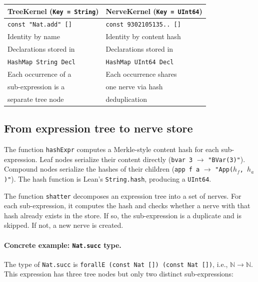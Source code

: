 \begin{center}\small
\begin{tabular}{@{}p{}p{}@{}}
\toprule
\textbf{TreeKernel} (\texttt{Key = String}) & \textbf{NerveKernel} (\texttt{Key = UInt64}) \\
\midrule
\texttt{const "Nat.add" []} & \texttt{const 9302105135.. []} \\[2pt]
Identity by name & Identity by content hash \\[2pt]
Declarations stored in & Declarations stored in \\
\quad\texttt{HashMap String Decl} & \quad\texttt{HashMap UInt64 Decl} \\[2pt]
Each occurrence of a & Each occurrence shares \\
sub-expression is a & one nerve via hash \\
separate tree node & deduplication \\
\bottomrule
\end{tabular}
\end{center}

\subsection{From expression tree to nerve store}\label{sec:tree-to-nerve}

The function \texttt{hashExpr} computes a Merkle-style content hash for each sub-expression.  Leaf nodes serialize their content directly (\texttt{bvar 3} $\to$ \texttt{"BVar(3)"}).  Compound nodes serialize the hashes of their children (\texttt{app f a} $\to$ \texttt{"App($h_f$, $h_a$)"}).  The hash function is Lean's \texttt{String.hash}, producing a \texttt{UInt64}.

The function \texttt{shatter} decomposes an expression tree into a set of nerves.  For each sub-expression, it computes the hash and checks whether a nerve with that hash already exists in the store.  If so, the sub-expression is a duplicate and is skipped.  If not, a new nerve is created.

\paragraph{Concrete example: \texttt{Nat.succ} type.}
The type of \texttt{Nat.succ} is \texttt{forallE (const Nat []) (const Nat [])}, i.e., $\mathbb{N} \to \mathbb{N}$.  This expression has three tree nodes but only two distinct sub-expressions:

